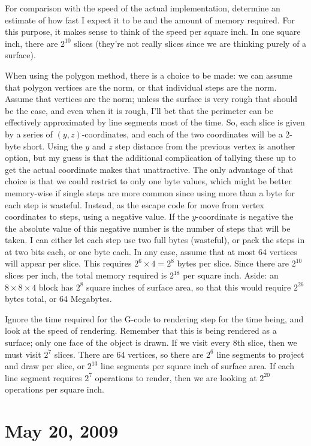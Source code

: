 \documentclass[titlepage,oneside,10pt]{article}
\begin{document}
For comparison with the speed of the actual implementation, determine
an estimate of how fast I expect it to be and the amount of memory
required. For this purpose, it makes sense to think of the speed per
square inch. In one square inch, there are $2^{10}$ slices (they're
not really slices since we are thinking purely of a surface). 

When using the polygon method, there is a choice to be made: we can
assume that polygon vertices are the norm, or that individual steps
are the norm. Assume that vertices are the norm; unless the surface is
very rough that should be the case, and even when it is rough, I'll bet
that the perimeter can be effectively approximated by line
segments most of the time. So, each slice is given by a series of
$(y,z)$-coordinates, and each of the two coordinates will be a 2-byte
short. Using the $y$ and $z$ step distance from the previous vertex is
another option, but my guess is that the additional complication of
tallying these up to get the actual coordinate makes that
unattractive. The only advantage of that choice is that we could
restrict to only one byte values, which might be better memory-wise if
single steps are more common since using more than a byte for each
step is wasteful. Instead, as the escape code for move from vertex
coordinates to steps, using a negative value. If the $y$-coordinate is
negative the the absolute value of this negative number is the number
of steps that will be taken. I can either let each step use two full
bytes (wasteful), or pack the steps in at two bits each, or one byte
each. In any case, assume that at most 64 vertices will appear per
slice. This requires $2^6\times 4 = 2^8$ bytes per slice. Since there
are $2^{10}$ slices per inch, the total memory required is $2^{18}$
per square inch. Aside: an $8\times8\times 4$ block has $2^8$ square
inches of surface area, so that this would require $2^{26}$ bytes
total, or 64 Megabytes.

Ignore the time required for the G-code to rendering step for the time
being, and look at the speed of rendering. Remember that this is being
rendered as a surface; only one face of the object is drawn. If we
visit every 8th slice, then we must visit $2^7$ slices. There are 64
vertices, so there are $2^6$ line segments to project and draw per
slice, or $2^{13}$ line segments per square inch of surface area. If
each line segment requires $2^7$ operations to render, then we are
looking at $2^{20}$ operations per square inch.

\section{May 20, 2009}
\end{document}
